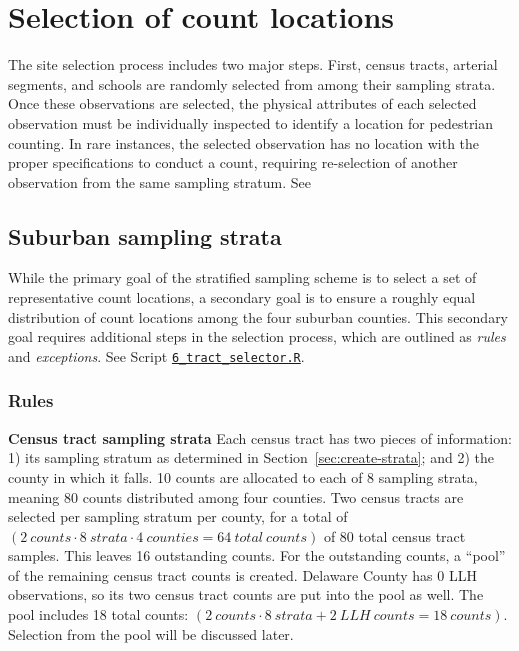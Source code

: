 \documentclass[paper=letterpaper, fontsize=11pt]{scrartcl}
\begin{document}
\section{Selection of count locations}
\label{sec:site-selection}
The site selection process includes two major steps. First, census tracts, arterial segments, and schools are randomly selected from among their sampling strata. Once these observations are selected, the physical attributes of each selected observation must be individually inspected to identify a location for pedestrian counting. In rare instances, the selected observation has no location with the proper specifications to conduct a count, requiring re-selection of another observation from the same sampling stratum. See 

\subsection{Suburban sampling strata}
While the primary goal of the stratified sampling scheme is to select a set of representative count locations, a secondary goal is to ensure a roughly equal distribution of count locations among the four suburban counties. This secondary goal requires additional steps in the selection process, which are outlined as \textit{rules} and \textit{exceptions}. See Script \href{https://github.com/addisonlarson/ped_counts/blob/master/6\_tract\_selector.R}{\texttt{6\_tract\_selector.R}}.\\

\subsubsection{Rules}

\textbf{Census tract sampling strata} Each census tract has two pieces of information: 1) its sampling stratum as determined in Section~\ref{sec:create-strata}; and 2) the county in which it falls. 10 counts are allocated to each of 8 sampling strata, meaning 80 counts distributed among four counties. Two census tracts are selected per sampling stratum per county, for a total of $\left(2\:counts \cdot 8\:strata \cdot 4\:counties = 64\:total\:counts\right)$ of 80 total census tract samples. This leaves 16 outstanding counts. For the outstanding counts, a ``pool'' of the remaining census tract counts is created. Delaware County has 0 LLH observations, so its two census tract counts are put into the pool as well. The pool includes 18 total counts: $\left(2\:counts \cdot 8\:strata + 2\:LLH \:counts = 18\:counts \right)$. Selection from the pool will be discussed later. \\
\end{document}

